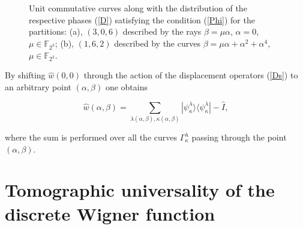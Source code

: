 \documentclass[quantumrep,article,submit,pdftex,moreauthors]{Definitions/mdpi}
\begin{document}
\begin{figure}[ht]
  \centering
  \caption{
    Unit commutative curves along with the distribution of the respective phases
    (\ref{D}) satisfying the condition (\ref{Phi}) for the partitions: (a),
    $(3,0,6)$ described by the rays $\beta = \mu \alpha$, $\alpha = 0$, $\mu \in
    \mathbb F_{2^{3}}$; (b), $(1,6,2)$ described by the curves $\beta = \mu
    \alpha + \alpha^2 + \alpha^{4}$, $\mu \in \mathbb F_{2^{3}}$.
  }
  \label{fig1}
\end{figure}

By shifting $\hat{w}\left(0,0\right)$ through the action of the displacement
operators (\ref{Ds}) to an arbitrary point $(\alpha,\beta )$ one obtains

\begin{equation}
  \hat{w}(\alpha,\beta)
  = \sum_{\lambda(\alpha,\beta),\kappa(\alpha,\beta)}
  |\psi_{\kappa}^{\lambda}\rangle \langle \psi_{\kappa}^{\lambda}| - \hat{I},
  \label{wab}
\end{equation}

where the sum is performed over all the curves $\Gamma_{\kappa }^{\lambda }$
passing through the point $(\alpha,\beta)$.

\section{Tomographic universality of the discrete Wigner function}
\end{document}
